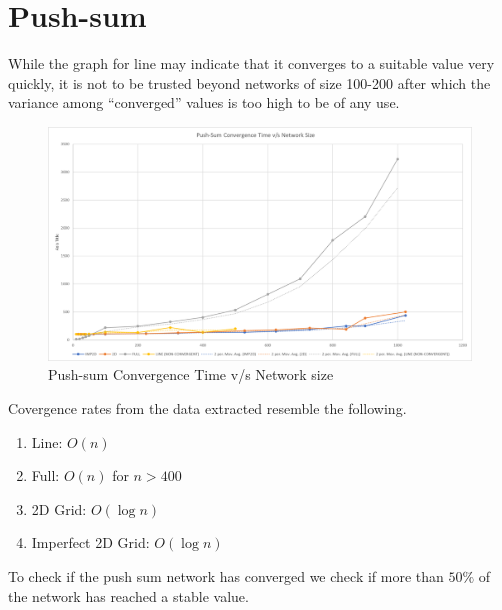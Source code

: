 \documentclass[a4paper, 10pt]{article}
\begin{document}
    \section{Push-sum}
    While the graph for line may indicate that it converges to a suitable value very quickly, it is not to be trusted beyond networks of size 100-200 after which the variance among ``converged'' values is too high to be of any use.

    \begin{figure}[h]
      \caption{Push-sum Convergence Time v/s Network size}
      \includegraphics[width=\textwidth]{project2_psum_chart}
    \end{figure}

    Covergence rates from the data extracted resemble the following.
    \begin{enumerate}
      \item{Line: $O(n)$}
      \item{Full: $O(n)$} for $n > 400$
      \item{2D Grid: $O(\log n)$}
      \item{Imperfect 2D Grid: $O(\log n)$}
    \end{enumerate}

    To check if the push sum network has converged we check if more than $50\%$ of the network has reached a stable value.
\end{document}
